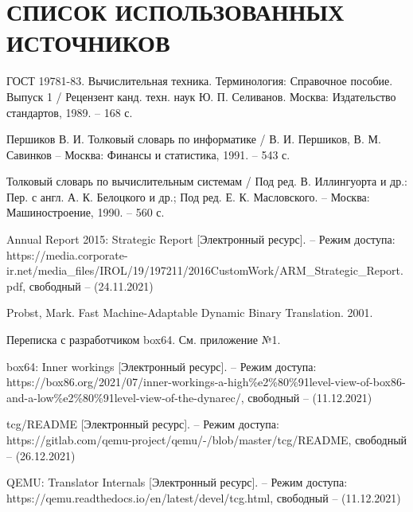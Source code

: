 \section*{СПИСОК ИСПОЛЬЗОВАННЫХ ИСТОЧНИКОВ}

\begingroup
\renewcommand{\section}[2]{}
\begin{thebibliography}{}
	ГОСТ 19781-83. Вычислительная техника. Терминология: Справочное пособие. Выпуск 1 / Рецензент канд. техн. наук Ю. П. Селиванов. Москва: Издательство стандартов, 1989. -- 168 с.
		 		 
	Першиков В. И. Толковый словарь по информатике / В. И. Першиков, В. М. Савинков -- Москва: Финансы и статистика, 1991. -- 543 с.
	
	Толковый словарь по вычислительным системам / Под ред. В. Иллингуорта и др.: Пер. с англ. А. К. Белоцкого и др.; Под ред. Е. К. Масловского. -- Москва: Машиностроение, 1990. -- 560 с.
	
	Annual Report 2015: Strategic Report [Электронный ресурс]. -- Режим доступа: https://media.corporate-ir.net/media\_files/IROL/19/197211/2016CustomWork/ARM\_Strategic\_Report.pdf,
	свободный -- (24.11.2021)
	
	Probst, Mark. Fast Machine-Adaptable Dynamic Binary Translation. 2001.
	
	Переписка с разработчиком box64. См. приложение №1.
	
	box64: Inner workings [Электронный ресурс]. -- Режим доступа: https://box86.org/2021/07/inner-workings-a-high\%e2\%80\%91level-view-of-box86-and-a-low\%e2\%80\%91level-view-of-the-dynarec/,
	свободный -- (11.12.2021)
	
	tcg/README  [Электронный ресурс]. -- Режим доступа: https://gitlab.com/qemu-project/qemu/-/blob/master/tcg/README,
	свободный -- (26.12.2021)
	
	QEMU: Translator Internals [Электронный ресурс]. -- Режим доступа: https://qemu.readthedocs.io/en/latest/devel/tcg.html,
	свободный -- (11.12.2021)
	


\end{thebibliography}
